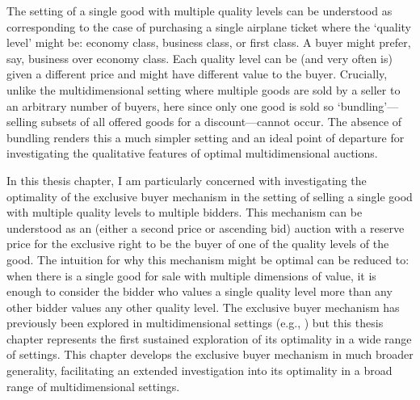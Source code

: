 \documentclass{article}
\begin{document}
The setting of a single good with multiple quality levels can be understood as corresponding to the case of purchasing a single airplane ticket where the `quality level' might be: economy class, business class, or first class. A buyer might prefer, say, business over economy class. Each quality level can be (and very often is) given a different price and might have different value to the buyer. Crucially, unlike the multidimensional setting where multiple goods are sold by a seller to an arbitrary number of buyers, here since only one good is sold so `bundling'---selling subsets of all offered goods for a discount---cannot occur. The absence of bundling renders this a much simpler setting and an ideal point of departure for investigating the qualitative features of optimal multidimensional auctions.

In this thesis chapter, I am particularly concerned with investigating the optimality of the exclusive buyer mechanism in the setting of selling a single good with multiple quality levels to multiple bidders. This mechanism can be understood as an (either a second price or ascending bid) auction with a reserve price for the exclusive right to be the buyer of one of the quality levels of the good. The intuition for why this mechanism might be optimal can be reduced to: when there is a single good for sale with multiple dimensions of value, it is enough to consider the bidder who values a single quality level more than any other bidder values any other quality level. The exclusive buyer mechanism has previously been explored in multidimensional settings (e.g., \cite{brusco2011, belloni2010multidimensional}) but this thesis chapter represents the first sustained exploration of its optimality in a wide range of settings. This chapter develops the exclusive buyer mechanism in much broader generality, facilitating an extended investigation into its optimality in a broad range of multidimensional settings. 
 

\end{document}
